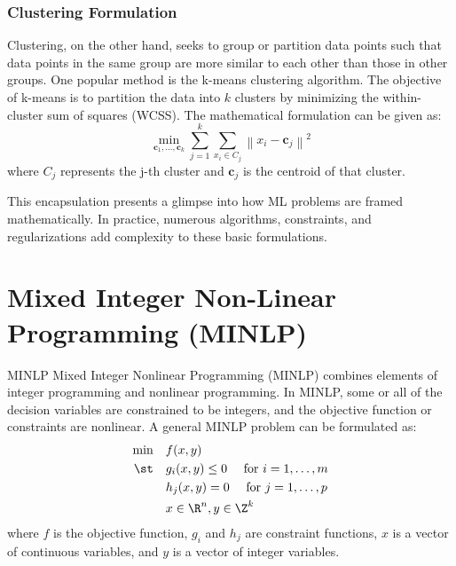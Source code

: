\subsubsection*{Clustering Formulation}

Clustering, on the other hand, seeks to group or partition data points such that data points in the same group are more similar to each other than those in other groups. One popular method is the k-means clustering algorithm. The objective of k-means is to partition the data into \( k \) clusters by minimizing the within-cluster sum of squares (WCSS). The mathematical formulation can be given as:
\begin{equation}
\min_{\mathbf{c}_1, \ldots, \mathbf{c}_k} \sum_{j=1}^{k} \sum_{x_i \in C_j} \left\| x_i - \mathbf{c}_j \right\|^2
\end{equation}
where \( C_j \) represents the j-th cluster and \( \mathbf{c}_j \) is the centroid of that cluster.

This encapsulation presents a glimpse into how ML problems are framed mathematically. In practice, numerous algorithms, constraints, and regularizations add complexity to these basic formulations.


\section{Mixed Integer Non-Linear Programming (MINLP)}

\begin{general}{MINLP}{\nphard}
Mixed Integer Nonlinear Programming (MINLP) combines elements of integer programming and nonlinear programming. In MINLP, some or all of the decision variables are constrained to be integers, and the objective function or constraints are nonlinear. A general MINLP problem can be formulated as:
\begin{equation}
\label{eq:minlp}
\begin{split}
\min \quad & f(x, y)\\
\st  \quad & g_i(x, y) \leq 0  \quad  \text{ for } i=1, \dots, m\\
           & h_j(x, y) = 0    \quad  \text{ for } j=1, \dots, p\\
           & x \in \R^n, y \in \Z^k
\end{split}
\end{equation}
where $f$ is the objective function, $g_i$ and $h_j$ are constraint functions, $x$ is a vector of continuous variables, and $y$ is a vector of integer variables.
\end{general}


